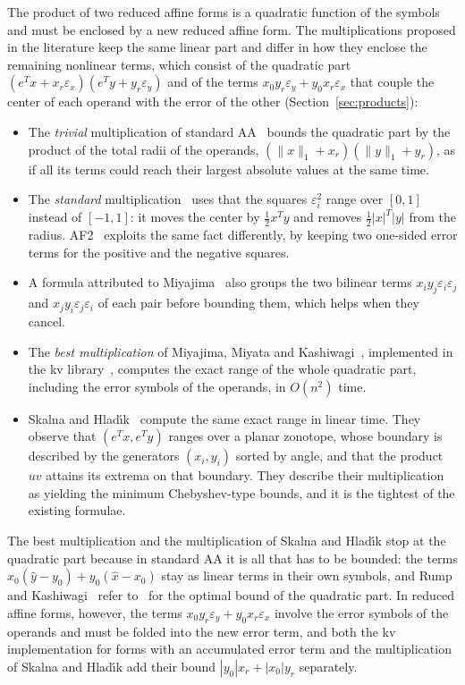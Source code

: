 \documentclass[11pt]{article}
\theoremstyle{definition}
\newcommand{\eps}{\varepsilon}
\newcommand{\ex}{\eps_x}
\newcommand{\ey}{\eps_y}
\begin{document}
The product of two reduced affine forms is a quadratic function of the symbols and must be enclosed by a new reduced affine form. The multiplications proposed in the literature keep the same linear part and differ in how they enclose the remaining nonlinear terms, which consist of the quadratic part $(e^Tx+x_r\ex)(e^Ty+y_r\ey)$ and of the terms $x_0y_r\ey+y_0x_r\ex$ that couple the center of each operand with the error of the other (Section~\ref{sec:products}):
\begin{itemize}
\item The \emph{trivial} multiplication of standard AA~\cite{stolfi1997self} bounds the quadratic part by the product of the total radii of the operands, $(\|x\|_1+x_r)(\|y\|_1+y_r)$, as if all its terms could reach their largest absolute values at the same time.
\item The \emph{standard} multiplication~\cite{kolev2004improved,vu2009enhancing} uses that the squares $\eps_i^2$ range over $[0,1]$ instead of $[-1,1]$: it moves the center by $\tfrac12x^Ty$ and removes $\tfrac12|x|^T|y|$ from the radius. AF2~\cite{messine2002extentions} exploits the same fact differently, by keeping two one-sided error terms for the positive and the negative squares.
\item A formula attributed to Miyajima~\cite{skalna2017new} also groups the two bilinear terms $x_iy_j\eps_i\eps_j$ and $x_jy_i\eps_j\eps_i$ of each pair before bounding them, which helps when they cancel.
\item The \emph{best multiplication} of Miyajima, Miyata and Kashiwagi~\cite{miyajima2003best}, implemented in the kv library~\cite{kvlib}, computes the exact range of the whole quadratic part, including the error symbols of the operands, in $O(n^2)$ time.
\item Skalna and Hlad\'{\i}k~\cite{skalna2017new} compute the same exact range in linear time. They observe that $(e^Tx,e^Ty)$ ranges over a planar zonotope, whose boundary is described by the generators $(x_i,y_i)$ sorted by angle, and that the product $uv$ attains its extrema on that boundary. They describe their multiplication as yielding the minimum Chebyshev-type bounds, and it is the tightest of the existing formulae.
\end{itemize}
The best multiplication and the multiplication of Skalna and Hlad\'{\i}k stop at the quadratic part because in standard AA it is all that has to be bounded: the terms $x_0(\hat y-y_0)+y_0(\hat x-x_0)$ stay as linear terms in their own symbols, and Rump and Kashiwagi~\cite{rump2015implementation} refer to~\cite{miyajima2003best} for the optimal bound of the quadratic part. In reduced affine forms, however, the terms $x_0y_r\ey+y_0x_r\ex$ involve the error symbols of the operands and must be folded into the new error term, and both the kv implementation for forms with an accumulated error term and the multiplication of Skalna and Hlad\'{\i}k add their bound $|y_0|x_r+|x_0|y_r$ separately.
\end{document}
